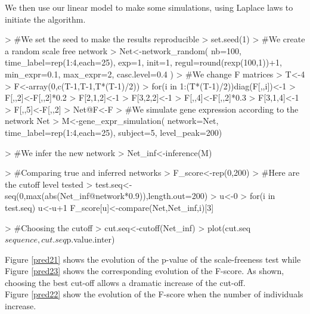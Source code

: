 \documentclass[a4paper]{article}
\begin{document}
We then use our linear model to make some simulations, using Laplace laws to initiate the algorithm.  


\begin{Schunk}
\begin{Sinput}
> #We set the seed to make the results reproducible 
> set.seed(1)
> #We create a random scale free network
> Net<-network_random(
   	nb=100,
   	time_label=rep(1:4,each=25),
   	exp=1,
   	init=1,
   	regul=round(rexp(100,1))+1,
   	min_expr=0.1,
   	max_expr=2,
   	casc.level=0.4
   	)
> #We change F matrices
> T<-4 
> F<-array(0,c(T-1,T-1,T*(T-1)/2))
> for(i in 1:(T*(T-1)/2)){diag(F[,,i])<-1}
> F[,,2]<-F[,,2]*0.2
> F[2,1,2]<-1
> F[3,2,2]<-1
> F[,,4]<-F[,,2]*0.3
> F[3,1,4]<-1
> F[,,5]<-F[,,2]
> Net@F<-F
> #We simulate gene expression according to the network Net
> M<-gene_expr_simulation(
   	network=Net,
   	time_label=rep(1:4,each=25),
   	subject=5,
   	level_peak=200)
\end{Sinput}
\end{Schunk}


\begin{Schunk}
\begin{Sinput}
> #We infer the new network
> Net_inf<-inference(M)
\end{Sinput}
\end{Schunk}

\begin{Schunk}
\begin{Sinput}
> #Comparing true and inferred networks
> F_score<-rep(0,200)
> #Here are the cutoff level tested
> test.seq<-seq(0,max(abs(Net_inf@network*0.9)),length.out=200)
> u<-0
> for(i in test.seq){
   	u<-u+1
   	F_score[u]<-compare(Net,Net_inf,i)[3]
   }
\end{Sinput}
\end{Schunk}


\begin{Schunk}
\begin{Sinput}
> #Choosing the cutoff
> cut.seq<-cutoff(Net_inf)
> plot(cut.seq$sequence,cut.seq$p.value.inter)
\end{Sinput}
\end{Schunk}


Figure \ref{pred21} shows the evolution of the p-value of the scale-freeness test while 
Figure \ref{pred23} shows the corresponding evolution of the F-score. As shown, choosing the 
best cut-off allows a dramatic increase of the cut-off. \\

Figure \ref{pred22} show the evolution of the F-score when the number of individuals increase. 
\end{document}

